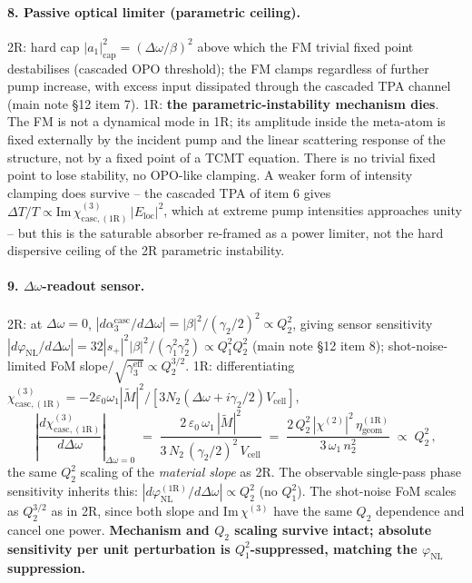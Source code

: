 \documentclass[11pt,a4paper]{article}
\newcommand{\eps}{\varepsilon}
\newcommand{\chitwo}{\chi^{(2)}}
\newcommand{\chithree}{\chi^{(3)}}
\newcommand{\Dom}{\Delta\omega}
\newcommand{\chicascOneR}{\chi^{(3)}_{\text{casc},(1\mathrm R)}}
\newcommand{\Vunit}{V_{\text{cell}}}
\begin{document}
\paragraph{8. Passive optical limiter (parametric ceiling).}
2R: hard cap $|a_1|^{2}_\text{cap}=(\Dom/\beta)^{2}$ above which the FM
trivial fixed point destabilises (cascaded OPO threshold); the FM clamps
regardless of further pump increase, with excess input dissipated through
the cascaded TPA channel (main note \S 12 item 7).
1R: \textbf{the parametric-instability mechanism dies}.  The FM is not a
dynamical mode in 1R; its amplitude inside the meta-atom is fixed
externally by the incident pump and the linear scattering response of the
structure, not by a fixed point of a TCMT equation.  There is no trivial
fixed point to lose stability, no OPO-like clamping.  A weaker form of
intensity clamping does survive -- the cascaded TPA of item 6 gives
$\Delta T/T\propto\mathrm{Im}\,\chicascOneR\,|E_\text{loc}|^{2}$, which
at extreme pump intensities approaches unity -- but this is the saturable
absorber re-framed as a power limiter, not the hard dispersive ceiling of
the 2R parametric instability.

\paragraph{9. \texorpdfstring{$\Dom$}{Δω}-readout sensor.}
2R: at $\Dom=0$,
$|d\alpha_3^\text{casc}/d\Dom|=|\beta|^{2}/(\gamma_2/2)^{2}\propto Q_2^{2}$,
giving sensor sensitivity
$|d\varphi_\text{NL}/d\Dom|=32|s_+|^{2}|\beta|^{2}/(\gamma_1^{2}\gamma_2^{2})\propto Q_1^{2}Q_2^{2}$
(main note \S 12 item 8); shot-noise-limited FoM
slope$/\sqrt{\gamma_3^\text{eff}}\propto Q_2^{3/2}$.
1R: differentiating $\chicascOneR=-2\eps_0\omega_1|\widetilde M|^{2}/[3N_2(\Dom+i\gamma_2/2)\Vunit]$,
\begin{equation}
  \left|\frac{d\chicascOneR}{d\Dom}\right|_{\Dom=0}
   \;=\;\frac{2\,\eps_0\,\omega_1\,|\widetilde M|^{2}}{3\,N_2\,(\gamma_2/2)^{2}\,\Vunit}
   \;=\;\frac{2\,Q_2^{2}\,|\chitwo|^{2}\,\eta_\text{geom}^{(1\mathrm R)}}
              {3\,\omega_1\,n_2^{2}}
   \;\propto\;Q_2^{2}\,,
  \label{eq:sensor-1R-slope}
\end{equation}
the same $Q_2^{2}$ scaling of the \emph{material slope} as 2R.  The
observable single-pass phase sensitivity inherits this:
$|d\varphi_\text{NL}^{(1\mathrm R)}/d\Dom|\propto Q_2^{2}$ (no $Q_1^{2}$).
The shot-noise FoM scales as $Q_2^{3/2}$ as in 2R, since both slope and
$\mathrm{Im}\,\chithree$ have the same $Q_2$ dependence and cancel one
power.  \textbf{Mechanism and $Q_2$ scaling survive intact;
absolute sensitivity per unit perturbation is $Q_1^{2}$-suppressed,
matching the $\varphi_\text{NL}$ suppression.}
\end{document}
